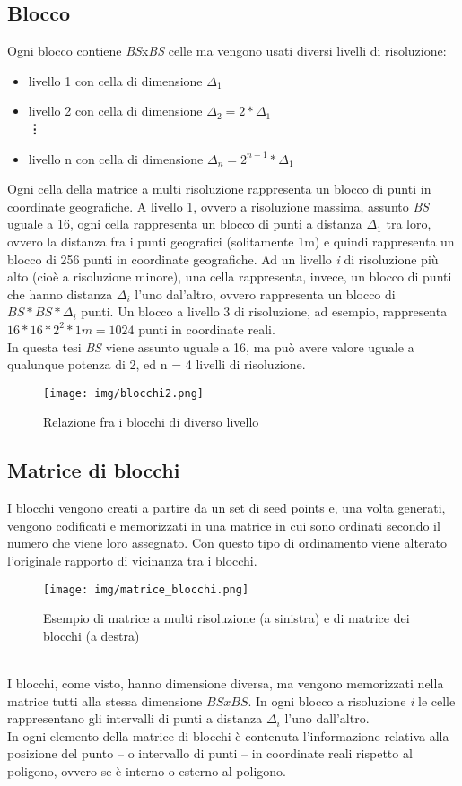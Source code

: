 	\subsection{Blocco}  
		Ogni blocco contiene \textit{BS}x\textit{BS} celle ma vengono usati diversi livelli di risoluzione: 
		\begin{itemize}
			\item livello 1 con cella di dimensione $\Delta_1$
			\item livello 2 con cella di dimensione $\Delta_2 = 2 * \Delta_1$ \\
			\textbf{\vdots}
			\item livello n con cella di dimensione $\Delta_n = 2^{n-1} * \Delta_1$
		\end{itemize}
		Ogni cella della matrice a multi risoluzione rappresenta un blocco di punti in coordinate geografiche. A livello 1, ovvero a risoluzione massima, assunto \textit{BS} uguale a 16, ogni cella rappresenta un blocco di punti a distanza $\Delta_1$ tra loro, ovvero la distanza fra i punti geografici (solitamente 1m) e quindi rappresenta un blocco di 256 punti in coordinate geografiche. Ad un livello \textit{i} di risoluzione pi\`{u} alto (cio\`{e} a risoluzione minore), una cella rappresenta, invece, un blocco di punti che hanno distanza $\Delta_i$ l'uno dal'altro, ovvero rappresenta un blocco di $BS*BS*\Delta_i$ punti. Un blocco a livello 3 di risoluzione, ad esempio, rappresenta $16*16*2^2*1m = 1024$ punti in coordinate reali.\\ 
		In questa tesi \textit{BS} viene assunto uguale a 16, ma pu\`{o} avere valore uguale a qualunque potenza di 2, ed n = 4 livelli di risoluzione. 
		\begin{figure}[htbp]
			\centering
			\texttt{[image: img/blocchi2.png]}
			\caption{Relazione fra i blocchi di diverso livello}
		\end{figure}

	\subsection{Matrice di blocchi} 
		I blocchi vengono creati a partire da un set di seed points e, una volta generati, vengono codificati e memorizzati in una matrice in cui sono ordinati secondo il numero che viene loro assegnato. Con questo tipo di ordinamento viene alterato l'originale rapporto di vicinanza tra i blocchi.
		\begin{figure}[htbp]
			\centering
			\texttt{[image: img/matrice\_blocchi.png]}
			\caption{Esempio di matrice a multi risoluzione (a sinistra) e di matrice dei blocchi (a destra)}
		\end{figure}\\
		I blocchi, come visto, hanno dimensione diversa, ma vengono memorizzati nella matrice tutti alla stessa dimensione $BSxBS$. In ogni blocco a risoluzione \textit{i} le celle rappresentano gli intervalli di punti a distanza $\Delta_i$ l'uno dall'altro.\\
		In ogni elemento della matrice di blocchi \`{e} contenuta l'informazione relativa alla posizione del punto -- o intervallo di punti -- in coordinate reali rispetto al poligono, ovvero se \`{e} interno o esterno al poligono. 

